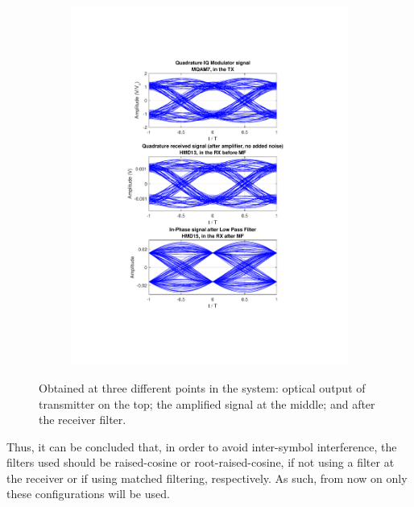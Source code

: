\begin{refsection}
\begin{figure}[H]
\begin{minipage}{\linewidth}
\begin{subfigure}{.45\textwidth}
		\includegraphics[clip, trim=4cm 4cm 4cm 4cm,
			width=\textwidth]{./sdf/m_qam_system/figures/eyes/simulRrc03Sp60Np00_q.pdf}
	\end{subfigure}
	
	\caption{
		Obtained at
		three different points in the system: optical output of transmitter on the top;
		the amplified signal at the middle; and
		after the receiver filter.
		\label{fig:eyes_nn_rrc_03}}
	\end{minipage}
	
\end{figure}

Thus, it can be concluded that, in order to avoid inter-symbol interference,
the filters used should be raised-cosine or root-raised-cosine, if not using a
filter at the receiver or if using matched filtering, respectively. As such,
from now on only these configurations will be used.


\end{refsection}
